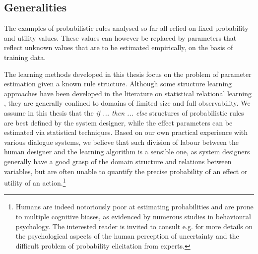 \subsection{Generalities}

The examples of probabilistic rules analysed so far all relied on fixed probability and utility values. These values can however be replaced by parameters that reflect unknown values that are to be estimated empirically, on the basis of training data. 
 
The learning methods developed in this thesis focus on the problem of parameter estimation given a known rule structure.  Although some structure learning approaches have been developed in the literature on statistical relational learning \citep[see e.g. ][]{PasulaZK07,Kok:2009}, they are generally confined to domains of limited size and full observability. We assume in this thesis that the \textit{if ... then ... else} structures of probabilistic rules are best defined by the system designer, while the effect parameters can be estimated via statistical techniques. Based on our own practical experience with various dialogue systems, we believe that such division of labour between the human designer and the learning algorithm is a sensible one, as system designers generally have a good grasp of the domain structure and relations between variables, but are often unable to quantify the precise probability of an effect or utility of an action.\footnote{Humans are indeed notoriously poor at estimating probabilities and are prone to multiple cognitive biases, as evidenced by numerous studies in behavioural psychology.  The interested reader is invited to consult e.g. \cite{KahnemanSlovicTversky81,morganhenrion} for more details on the psychological aspects of the human perception of uncertainty and the difficult problem of probability elicitation from experts.}

